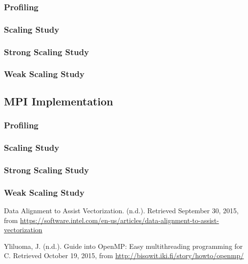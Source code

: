 \documentclass[11pt]{article}
\begin{document}
\subsubsection{Profiling} \label{sec:prof}
\subsubsection{Scaling Study} \label{sec:speedup}
\subsubsection{Strong Scaling Study}
\subsubsection{Weak Scaling Study}

\subsection{MPI Implementation}
\subsubsection{Profiling} \label{sec:prof}
\subsubsection{Scaling Study} \label{sec:speedup}
\subsubsection{Strong Scaling Study}
\subsubsection{Weak Scaling Study}


\begin{thebibliography}{9}
Data Alignment to Assist Vectorization. (n.d.). Retrieved September 30, 2015, from \url{https://software.intel.com/en-us/articles/data-alignment-to-assist-vectorization}

Yliluoma, J. (n.d.). Guide into OpenMP: Easy multithreading programming for C. Retrieved October 19, 2015, from \url{http://bisqwit.iki.fi/story/howto/openmp/}

\end{thebibliography}

 
 
\end{document}

